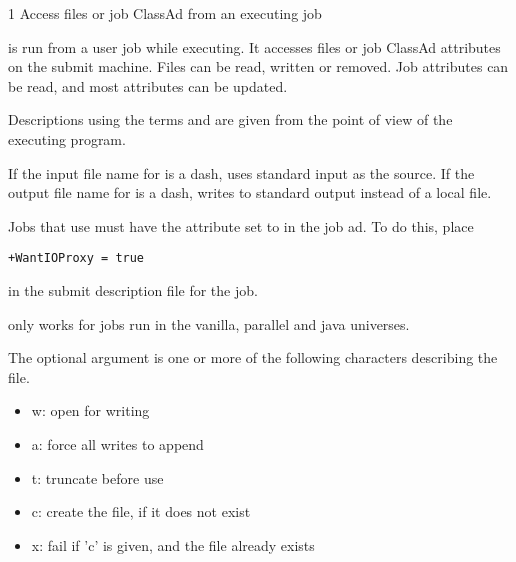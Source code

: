 \begin{ManPage}{\label{man-condor-chirp}}{1}
{Access files or job ClassAd from an executing job}
\Synopsis
{}

  

    

 

 

  

 

\Description 
{}
 is run from a user job while executing.
It accesses files or job ClassAd attributes on the submit machine.
Files can be read, written or removed.
Job attributes can be read, and most attributes can be updated.

Descriptions using the terms  and 
are given from the point of view of the executing program.

If the input file name for  is a dash,
 uses standard input as the source.
If the output file name for  is a dash,
 writes to standard output instead of a local file.

Jobs that use  must have the attribute
 set to  in the job ad.
To do this, place
\begin{verbatim}
+WantIOProxy = true
\end{verbatim}
in the submit description file for the job.

 only works for jobs run in the
vanilla, parallel and java universes.

The optional  argument
is one or more of the following characters describing the
 file.
  \begin{itemize}
    \item{w:  open for writing}
    \item{a:  force all writes to append}
    \item{t:  truncate before use}
    \item{c:  create the file, if it does not exist}
    \item{x:  fail if 'c' is given, and the file already exists}
  \end{itemize}


\end{ManPage}

